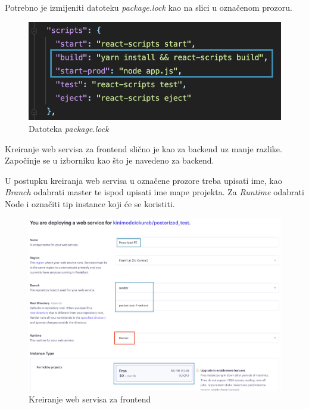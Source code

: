 \begin{enumerate}
			\pagebreak
			Potrebno je izmijeniti datoteku \textit{package.lock} kao na slici u označenom prozoru. 
			\begin{figure}[H]
				\includegraphics[scale=0.4]{slike/deploy/frontend7.png} %
				\centering
				\caption{Datoteka \textit{package.lock}}
				\label{fig:promjene}
			\end{figure}
			
			Kreiranje web servisa za frontend slično je kao za backend uz manje razlike. Započinje se u izborniku kao što je navedeno za backend.
			
			U postupku kreiranja web servisa u označene prozore treba upisati ime, kao \textit{Branch} odabrati master te ispod upisati ime mape projekta. Za \textit{Runtime} odabrati Node i označiti tip instance koji će se koristiti.
			\begin{figure}[H]
				\includegraphics[scale=0.3]{slike/deploy/frontend2.png} %
				\centering
				\caption{Kreiranje web servisa za frontend}
				\label{fig:promjene}
			\end{figure}
			

\end{enumerate}
